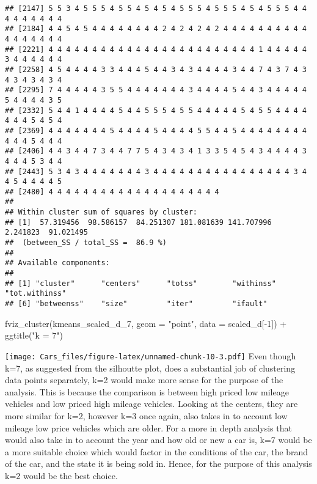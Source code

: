 \documentclass[
]{article}
\newenvironment{Shaded}{\begin{snugshade}}{\end{snugshade}}
\newcommand{\AttributeTok}[1]{\textcolor[rgb]{0.77,0.63,0.00}{#1}}
\newcommand{\DecValTok}[1]{\textcolor[rgb]{0.00,0.00,0.81}{#1}}
\newcommand{\FunctionTok}[1]{\textcolor[rgb]{0.00,0.00,0.00}{#1}}
\newcommand{\NormalTok}[1]{#1}
\newcommand{\SpecialCharTok}[1]{\textcolor[rgb]{0.00,0.00,0.00}{#1}}
\newcommand{\StringTok}[1]{\textcolor[rgb]{0.31,0.60,0.02}{#1}}
\begin{document}
\begin{verbatim}
## [2147] 5 5 3 4 5 5 5 4 5 5 4 5 4 5 4 5 5 5 4 5 5 5 4 5 4 5 5 5 4 4 4 4 4 4 4 4 4
## [2184] 4 4 5 4 5 4 4 4 4 4 4 4 4 2 4 2 4 2 4 2 4 4 4 4 4 4 4 4 4 4 4 4 4 4 4 4 4
## [2221] 4 4 4 4 4 4 4 4 4 4 4 4 4 4 4 4 4 4 4 4 4 4 4 4 1 4 4 4 4 4 3 4 4 4 4 4 4
## [2258] 4 5 4 4 4 4 3 3 4 4 4 5 4 4 3 4 3 4 4 4 4 3 4 4 7 4 3 7 4 3 4 3 4 3 4 3 4
## [2295] 7 4 4 4 4 4 3 5 5 4 4 4 4 4 4 4 3 4 4 4 4 5 4 4 3 4 4 4 4 4 5 4 4 4 4 3 5
## [2332] 5 4 4 1 4 4 4 4 5 4 4 5 5 5 4 5 5 4 4 4 4 4 5 4 5 5 4 4 4 4 4 4 4 5 4 5 4
## [2369] 4 4 4 4 4 4 4 5 4 4 4 4 5 4 4 4 4 5 5 4 4 5 4 4 4 4 4 4 4 4 4 4 4 5 4 4 4
## [2406] 4 4 3 4 4 7 3 4 4 7 7 5 4 3 4 3 4 1 3 3 5 4 5 4 3 4 4 4 4 3 4 4 4 5 3 4 4
## [2443] 5 3 4 3 4 4 4 4 4 4 4 3 4 4 4 4 4 4 4 4 4 4 4 4 4 4 4 4 3 4 4 5 4 4 4 4 5
## [2480] 4 4 4 4 4 4 4 4 4 4 4 4 4 4 4 4 4 4 4 4
## 
## Within cluster sum of squares by cluster:
## [1]  57.319456  98.586157  84.251307 181.081639 141.707996   2.241823  91.021495
##  (between_SS / total_SS =  86.9 %)
## 
## Available components:
## 
## [1] "cluster"      "centers"      "totss"        "withinss"     "tot.withinss"
## [6] "betweenss"    "size"         "iter"         "ifault"
\end{verbatim}

\begin{Shaded}
\begin{Highlighting}[]
\FunctionTok{fviz\_cluster}\NormalTok{(kmeans\_scaled\_d\_7, }\AttributeTok{geom =} \StringTok{"point"}\NormalTok{, }\AttributeTok{data =}\NormalTok{ scaled\_d[}\SpecialCharTok{{-}}\DecValTok{1}\NormalTok{]) }\SpecialCharTok{+} \FunctionTok{ggtitle}\NormalTok{(}\StringTok{"k = 7"}\NormalTok{)}
\end{Highlighting}
\end{Shaded}

\texttt{[image: Cars\_files/figure-latex/unnamed-chunk-10-3.pdf]} Even
though k=7, as suggested from the silhoutte plot, does a substantial job
of clustering data points separately, k=2 would make more sense for the
purpose of the analysis. This is because the comparison is between high
priced low mileage vehicles and low priced high mileage vehicles.
Looking at the centers, they are more similar for k=2, however k=3 once
again, also takes in to account low mileage low price vehicles which are
older. For a more in depth analysis that would also take in to account
the year and how old or new a car is, k=7 would be a more suitable
choice which would factor in the conditions of the car, the brand of the
car, and the state it is being sold in. Hence, for the purpose of this
analysis k=2 would be the best choice.
\end{document}
